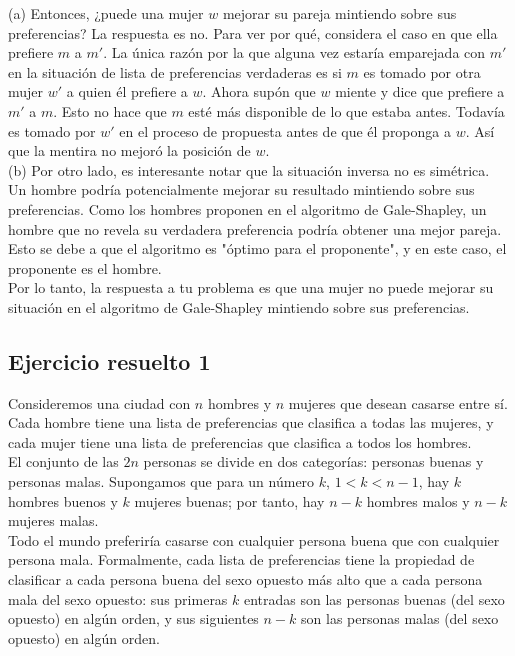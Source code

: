 \documentclass{article}
\begin{document}
(a) Entonces, ¿puede una mujer $w$ mejorar su pareja mintiendo sobre sus preferencias? La respuesta es no. Para ver por qué, considera el caso en que ella prefiere $m$ a $m'$. La única razón por la que alguna vez estaría emparejada con $m'$ en la situación de lista de preferencias verdaderas es si $m$ es tomado por otra mujer $w'$ a quien él prefiere a $w$. Ahora supón que $w$ miente y dice que prefiere a $m'$ a $m$. Esto no hace que $m$ esté más disponible de lo que estaba antes. Todavía es tomado por $w'$ en el proceso de propuesta antes de que él proponga a $w$. Así que la mentira no mejoró la posición de $w$.\\

(b) Por otro lado, es interesante notar que la situación inversa no es simétrica. Un hombre podría potencialmente mejorar su resultado mintiendo sobre sus preferencias. Como los hombres proponen en el algoritmo de Gale-Shapley, un hombre que no revela su verdadera preferencia podría obtener una mejor pareja. Esto se debe a que el algoritmo es "óptimo para el proponente", y en este caso, el proponente es el hombre.\\

Por lo tanto, la respuesta a tu problema es que una mujer no puede mejorar su situación en el algoritmo de Gale-Shapley mintiendo sobre sus preferencias.

\newpage

\subsection{Ejercicio resuelto 1}
Consideremos una ciudad con $n$ hombres y $n$ mujeres que desean casarse entre sí. Cada hombre tiene una lista de preferencias que clasifica a todas las mujeres, y cada mujer tiene una lista de preferencias que clasifica a todos los hombres.\\

El conjunto de las $2n$ personas se divide en dos categorías: personas buenas y
personas malas. Supongamos que para un número $k$, $1 < k < n - 1$, hay $k$ hombres buenos y $k$ mujeres buenas; por tanto, hay $n - k$ hombres malos y $n - k$ mujeres malas.\\

Todo el mundo preferiría casarse con cualquier persona buena que con cualquier persona mala.
Formalmente, cada lista de preferencias tiene la propiedad de clasificar a cada persona buena del sexo opuesto más alto que a cada persona mala del sexo opuesto: sus primeras $k$ entradas son las personas buenas (del sexo opuesto) en algún orden, y sus siguientes $n - k$ son las personas malas (del sexo opuesto) en algún orden. \\
\end{document}
